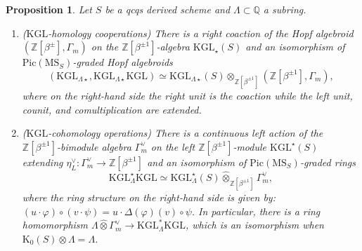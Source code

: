 \documentclass{amsart}
\numberwithin{equation}{section}
\theoremstyle{plain}
\newtheorem{proposition}[equation]{Proposition}
\theoremstyle{definition}
\let\bb=\mathbb
\def\Z{\bb Z}
\def\Q{\bb Q}
\def\Pic{\mathrm{Pic}}
\def\hatotimes{\mathbin{\widehat\otimes}}
\def\KGL{\mathrm{KGL}}
\def\K{\mathrm{K}{}}
\def\MS{\mathrm{MS}}
\let\phi=\varphi
\begin{document}
\begin{proposition}
	\label{prop:End(KGL)}
	Let $S$ be a qcqs derived scheme and $\Lambda\subset\Q$ a subring. 
	\begin{enumerate}
		\item \textnormal{($\KGL$-homology cooperations)} There is a right coaction of the Hopf algebroid $(\Z[\beta^{\pm}],\Gamma_m)$ on the $\Z[\beta^{\pm 1}]$-algebra $\KGL_{\star}(S)$ and an isomorphism of $\Pic(\MS_S)$-graded Hopf algebroids
		\[
		(\KGL_{\Lambda\star},\KGL_{\Lambda\star}\KGL)\simeq \KGL_{\Lambda\star}(S) \otimes_{\Z[\beta^{\pm 1}]} (\Z[\beta^{\pm 1}],\Gamma_m),
		\]
		where on the right-hand side the right unit is the coaction while the left unit, counit, and comultiplication are extended.
		\item \textnormal{($\KGL$-cohomology operations)} There is a continuous 
		left action of the $\Z[\beta^{\pm 1}]$-bimodule algebra $\Gamma_m^\vee$ on the left $\Z[\beta^{\pm 1}]$-module $\KGL^{\star}(S)$ 
		extending $\eta_L^\vee\colon \Gamma_m^\vee\to \Z[\beta^{\pm 1}]$ 
		and an isomorphism of $\Pic(\MS_S)$-graded rings
		\[
		\KGL_{\Lambda}^{\star}\KGL\simeq \KGL_\Lambda^{\star}(S)\hatotimes_{\Z[\beta^{\pm 1}]} \Gamma_m^\vee,
		\]
		where the ring structure on the right-hand side is given by: $(u\cdot\phi)\circ(v\cdot\psi)=u\cdot\Delta(\phi)(v)\circ \psi$.
		In particular, there is a ring homomorphism $\Lambda\hatotimes\Gamma_m^\vee\to \KGL_{\Lambda}^{*}\KGL$, which is an isomorphism when $\K_0(S)\otimes\Lambda=\Lambda$.
	\end{enumerate}
\end{proposition}
\end{document}

